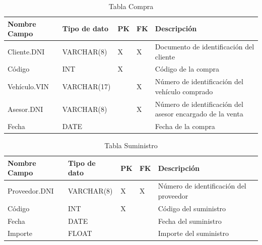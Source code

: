 \documentclass[12pt]{article}
\begin{document}
\begin{table}[htbp]
    \begin{center}
        \begin{tabular}{|p{3cm}|p{3cm}|p{1cm}|p{1cm}|p{6cm}|}
            \hline
            Nombre Campo & Tipo de dato & PK & FK & Descripción \\
            \hline
            Cliente.DNI & VARCHAR(8) & X & X & Documento de identificación del cliente\\
            Código & INT & X &  & Código de la compra \\
            Vehículo.VIN & VARCHAR(17) &  & X & Número de identificación del vehículo comprado \\
            Asesor.DNI & VARCHAR(8) &  & X & Número de identificación del asesor encargado de la venta \\
            Fecha & DATE &  &  & Fecha de la compra \\
            \hline
        \end{tabular}
        \caption{Tabla Compra}
        \label{tab:tablas}
    \end{center}
\end{table}


\begin{table}[htbp]
    \begin{center}
        \begin{tabular}{|p{3cm}|p{3cm}|p{1cm}|p{1cm}|p{6cm}|}
            \hline
            Nombre Campo & Tipo de dato & PK & FK & Descripción \\
            \hline
            Proveedor.DNI & VARCHAR(8) & X & X & Número de identificación del proveedor \\
            Código & INT & X &  & Código del suministro \\
            Fecha & DATE &  &  & Fecha del suministro \\
            Importe & FLOAT &  &  & Importe del suministro \\
            \hline
            \end{tabular}
        \caption{Tabla Suministro}
        \label{tab:tablas}
    \end{center}
\end{table}
\end{document}
